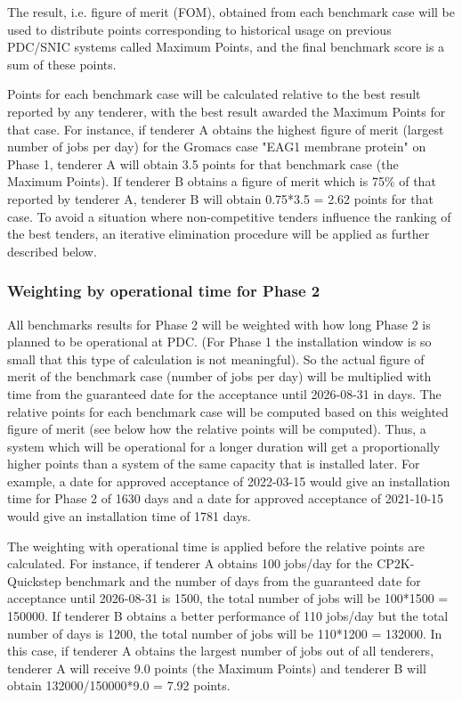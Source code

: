 \documentclass{article}
\begin{document}
The result, i.e. figure of merit (FOM), obtained from each benchmark case will be used to distribute points corresponding to historical usage on previous PDC/SNIC systems called Maximum Points, and the final benchmark score is a sum of these points.

Points for each benchmark case will be calculated relative to the best result reported by any tenderer, with the best result awarded the Maximum Points for that case. For instance, if tenderer A obtains the highest figure of merit (largest number of jobs per day) for the Gromacs case "EAG1 membrane protein" on Phase 1, tenderer A will obtain 3.5 points for that benchmark case (the Maximum Points). If tenderer B obtains a figure of merit which is 75\% of that reported by tenderer A, tenderer B will obtain 0.75*3.5 = 2.62 points for that case. To avoid a situation where non-competitive tenders influence the ranking of the best tenders, an iterative elimination procedure will be applied as further described below.

\subsubsection*{Weighting by operational time for Phase 2}

All benchmarks results for Phase 2 will be weighted with how long Phase 2 is planned to be operational at PDC. (For Phase 1 the
installation window is so small that this type of calculation is not meaningful). So the actual figure of merit of the benchmark case (number of jobs per day) will be multiplied with time from the guaranteed date for the acceptance until 2026-08-31 in days. The relative points for each benchmark case will be computed based on this weighted figure of merit (see below how the relative points will be computed). Thus, a system which will be operational for a longer duration will get a proportionally higher points than a system of the same capacity that is installed later. For example, a date for approved acceptance of 2022-03-15 would give an installation time for Phase 2 of 1630 days and a date for approved acceptance of 2021-10-15 would give an installation time of 1781 days.

The weighting with operational time is applied before the relative
points are calculated. For instance, if tenderer A obtains 100 jobs/day for the CP2K-Quickstep benchmark and the number of days from the guaranteed date for acceptance until 2026-08-31 is 1500, the total number of jobs will be 100*1500 = 150000. If tenderer B obtains a better performance of 110 jobs/day but the total number of days is
1200, the total number of jobs will be 110*1200 = 132000. In this
case, if tenderer A obtains the largest number of jobs out of all
tenderers, tenderer A will receive 9.0 points (the Maximum Points) and tenderer B will obtain 132000/150000*9.0 = 7.92 points.
\end{document}
